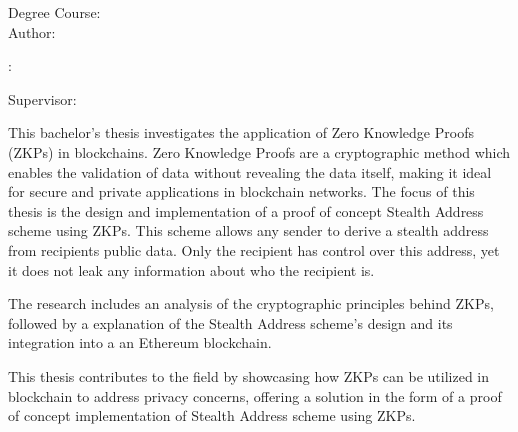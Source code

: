 \begin{minipage}[t]{1\columnwidth}
    \FIITuniversity

    \FIITfaculty

    Degree Course: \FIITstudyProgram\\

    Author: \FIITauthor

    \FIITthesis: \FIITtitle

    Supervisor: \FIITsupervisor

    \FIITdate
\end{minipage}

\bigskip{}

This bachelor's thesis investigates the application of Zero Knowledge Proofs
(ZKPs) in blockchains. Zero Knowledge Proofs are a cryptographic
method which enables the validation of data without revealing the
data itself, making it ideal for secure and private applications in
blockchain networks. The focus of this thesis is the design and implementation
of a proof of concept Stealth Address scheme using ZKPs. This scheme allows any sender to
derive a stealth address from recipients public data. Only the recipient has
control over this address, yet it does not leak any information about who the
recipient is.

The research includes an analysis of the cryptographic principles behind
ZKPs, followed by a explanation of the Stealth Address scheme's design and
its integration into a an Ethereum blockchain.

This thesis contributes to the field by showcasing how ZKPs can be utilized
in blockchain to address privacy concerns, offering a solution in the form of
a proof of concept  implementation of Stealth Address scheme using ZKPs.

\newpage{}\thispagestyle{empty}

\emptypage